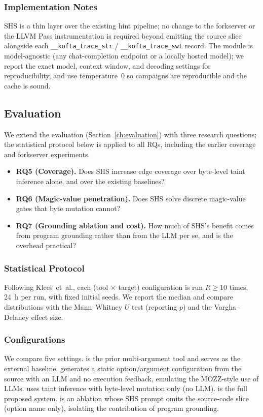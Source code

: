\subsubsection{Implementation Notes}
SHS is a thin layer over the existing hint pipeline; no change to the forkserver or the LLVM Pass instrumentation is required beyond emitting the source slice alongside each \texttt{\_\_kofta\_trace\_str} / \texttt{\_\_kofta\_trace\_swt} record. The module is model-agnostic (any chat-completion endpoint or a locally hosted model); we report the exact model, context window, and decoding settings for reproducibility, and use temperature~0 so campaigns are reproducible and the cache is sound.

\subsection{Evaluation}
We extend the evaluation (Section~\ref{ch:evaluation}) with three research questions; the statistical protocol below is applied to all RQs, including the earlier coverage and forkserver experiments.
\begin{itemize}
    \item \textbf{RQ5 (Coverage).} Does SHS increase edge coverage over byte-level taint inference alone, and over the existing baselines?
    \item \textbf{RQ6 (Magic-value penetration).} Does SHS solve discrete magic-value gates that byte mutation cannot?
    \item \textbf{RQ7 (Grounding ablation and cost).} How much of SHS's benefit comes from program grounding rather than from the LLM per se, and is the overhead practical?
\end{itemize}

\subsubsection{Statistical Protocol}
Following Klees~et~al., each (tool $\times$ target) configuration is run $R \geq 10$ times, 24~h per run, with fixed initial seeds. We report the median and compare distributions with the Mann--Whitney $U$ test (reporting $p$) and the Vargha--Delaney \Atwelve{} effect size.

\subsubsection{Configurations}
We compare five settings. \Weifuzz{} is the prior multi-argument tool and serves as the external baseline. \LLMonly{} generates a static option/argument configuration from the source with an LLM and no execution feedback, emulating the MOZZ-style use of LLMs. \KOFTA{} uses taint inference with byte-level mutation only (no LLM). \KSHS{} is the full proposed system. \KSHSng{} is an ablation whose SHS prompt omits the source-code slice (option name only), isolating the contribution of program grounding.

